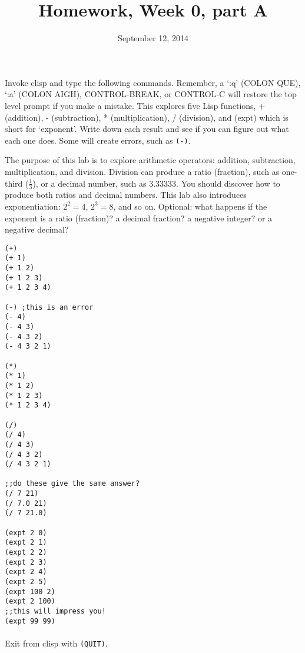 \documentclass{article}
\title{Homework, Week 0, part A}
\date{September 12, 2014}
\begin{document}
\maketitle{}
\lstset{language=Lisp}

Invoke clisp and type the following commands. Remember, a `:q' (COLON QUE), `:a' (COLON AIGH), CONTROL-BREAK, or CONTROL-C will restore the top level prompt if you make a mistake. This explores five Lisp functions, + (addition), - (subtraction), * (multiplication), / (division), and (expt) which is short for `exponent'. Write down each result and see if you can figure out what each one does. Some will create errors, such as \texttt{(-)}.

The purpose of this lab is to explore arithmetic operators: addition, subtraction, multiplication, and division. Division can produce a ratio (fraction), such as one-third ($\frac{1}{3}$), or a decimal number, such as 3.33333. You should discover how to produce both ratios and decimal numbers. This lab also introduces exponentiation: $2^2 = 4$, $2^3 = 8$, and so on. Optional: what happens if the exponent is a ratio (fraction)? a decimal fraction? a negative integer? or a negative decimal?
\begin{multicols}{2}
\begin{lstlisting}
(+)
(+ 1)
(+ 1 2)
(+ 1 2 3)
(+ 1 2 3 4)

(-) ;this is an error
(- 4)
(- 4 3)
(- 4 3 2)
(- 4 3 2 1)

(*)
(* 1)
(* 1 2)
(* 1 2 3)
(* 1 2 3 4)

(/)
(/ 4)
(/ 4 3)
(/ 4 3 2)
(/ 4 3 2 1)

;;do these give the same answer?
(/ 7 21)
(/ 7.0 21)
(/ 7 21.0)

(expt 2 0)
(expt 2 1)
(expt 2 2)
(expt 2 3)
(expt 2 4)
(expt 2 5)
(expt 100 2)
(expt 2 100)
;;this will impress you!
(expt 99 99)
\end{lstlisting}
\end{multicols}

\paragraph{}Exit from clisp with \texttt{(QUIT)}.
\end{document}

